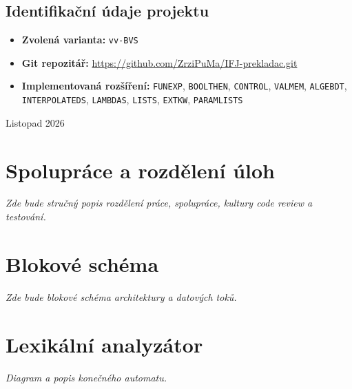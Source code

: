 \documentclass[12pt]{article}
\begin{document}
\vspace{1cm}
\noindent
\begin{minipage}{\textwidth}
\colorbox{brandpurple!8}{
\begin{minipage}{\dimexpr\textwidth-2\fboxsep\relax}
\vspace{0.6em}
\subsection*{Identifikační údaje projektu}
\begin{itemize}
    \item \textbf{Zvolená varianta:} \texttt{vv-BVS} 
    \item \textbf{Git repozitář:} \url{https://github.com/ZrziPuMa/IFJ-prekladac.git}
    \item \textbf{Implementovaná rozšíření:} \texttt{FUNEXP}, \texttt{BOOLTHEN}, \texttt{CONTROL}, \texttt{VALMEM}, \texttt{ALGEBDT}, \texttt{INTERPOLATEDS}, \texttt{LAMBDAS}, \texttt{LISTS}, \texttt{EXTKW}, \texttt{PARAMLISTS}
\end{itemize}
\vspace{0.4em}
\end{minipage}
}
\end{minipage}

\vfill
\begin{center}
    {\large Listopad 2026 \par}
\end{center}

\newpage

\thispagestyle{empty}
\tableofcontents
\newpage

\section{Spolupráce a rozdělení úloh}
\textit{Zde bude stručný popis rozdělení práce, spolupráce, kultury code review a testování.}

\newpage

\section{Blokové schéma}
\textit{Zde bude blokové schéma architektury a datových toků.}

\newpage

\section{Lexikální analyzátor}
\textit{Diagram a popis konečného automatu.}
\end{document}
